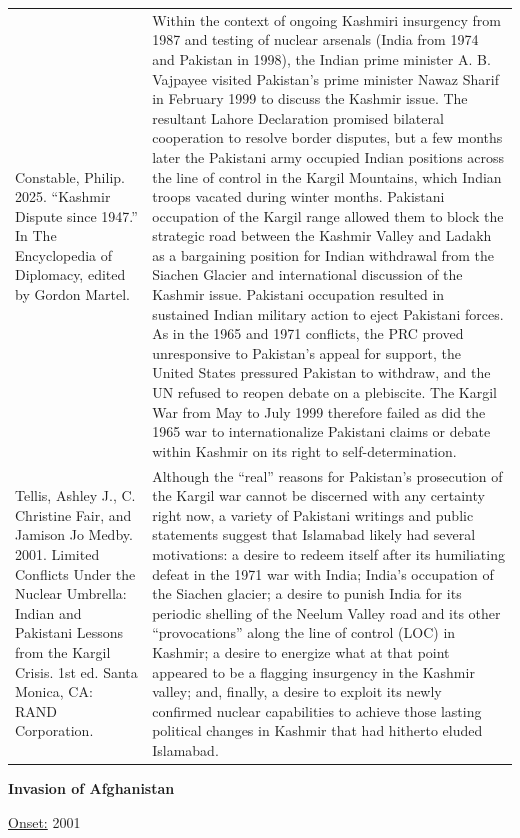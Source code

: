 {\begin{longtable}{p{}p{}}
Constable, Philip. 2025. “Kashmir Dispute since 1947.” In The Encyclopedia of Diplomacy, edited by Gordon Martel. &  Within the context of ongoing Kashmiri insurgency from 1987 and testing of nuclear arsenals (India from 1974 and Pakistan in 1998), the Indian prime minister A. B. Vajpayee visited Pakistan's prime minister Nawaz Sharif in February 1999 to discuss the Kashmir issue. The resultant Lahore Declaration promised bilateral cooperation to resolve border disputes, but a few months later the Pakistani army occupied Indian positions across the line of control in the Kargil Mountains, which Indian troops vacated during winter months. Pakistani occupation of the Kargil range allowed them to block the strategic road between the Kashmir Valley and Ladakh as a bargaining position for Indian withdrawal from the Siachen Glacier and international discussion of the Kashmir issue. Pakistani occupation resulted in sustained Indian military action to eject Pakistani forces. As in the 1965 and 1971 conflicts, the PRC proved unresponsive to Pakistan's appeal for support, the United States pressured Pakistan to withdraw, and the UN refused to reopen debate on a plebiscite. The Kargil War from May to July 1999 therefore failed as did the 1965 war to internationalize Pakistani claims or debate within Kashmir on its right to self-determination.
\\
Tellis, Ashley J., C. Christine Fair, and Jamison Jo Medby. 2001. Limited Conflicts Under the Nuclear Umbrella: Indian and Pakistani Lessons from the Kargil Crisis. 1st ed. Santa Monica, CA: RAND Corporation. & Although the “real” reasons for Pakistan's prosecution of the Kargil war cannot be discerned with any certainty right now, a variety of Pakistani writings and public statements suggest that Islamabad likely had several motivations: a desire to redeem itself after its humiliating defeat in the 1971 war with India; India's occupation of the Siachen glacier; a desire to punish India for its periodic shelling of the Neelum Valley road and its other “provocations” along the line of control (LOC) in Kashmir; a desire to energize what at that point appeared to be a flagging insurgency in the Kashmir valley; and, finally, a desire to exploit its newly confirmed nuclear capabilities to achieve those lasting political changes in Kashmir that had hitherto eluded Islamabad.
\\
\end{longtable}}
\clearpage
         \textbf{Invasion of Afghanistan} 

          \underline{Onset:} 2001         


